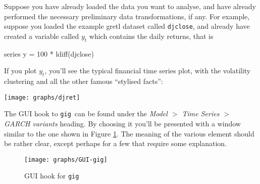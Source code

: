 \documentclass[a4paper,11pt]{article}
\newcommand{\app}[1]{\textsf{#1}}
\newcommand{\gig}{\texttt{gig}}
\begin{document}
Suppose you have already loaded the data you want to analyse, and have
already performed the necessary preliminary data transformations, if
any. For example, suppose you loaded the example \app{gretl} dataset
called \texttt{djclose}, and already have created a variable called
$y_t$ which contains the daily returns, that is
\begin{code}
  series y = 100 * ldiff(djclose)
\end{code}
If you plot $y_t$, you'll see the typical financial time series plot,
with the volatility clustering and all the other famous ``stylised
facts'':
\begin{center}
  \texttt{[image: graphs/djret]}
\end{center}

The GUI hook to \gig\ can be found under the \emph{Model $>$ Time
  Series $>$ GARCH variants} heading. By choosing it you'll be
presented with a window similar to the one shown in Figure
\ref{fig:GUI-gig}. The meaning of the various element should be rather
clear, except perhaps for a few that require some explanation.

\begin{figure}[htb]
  \centering
  \texttt{[image: graphs/GUI-gig]}
  \caption{GUI hook for \gig}
  \label{fig:GUI-gig}
\end{figure}
\end{document}

